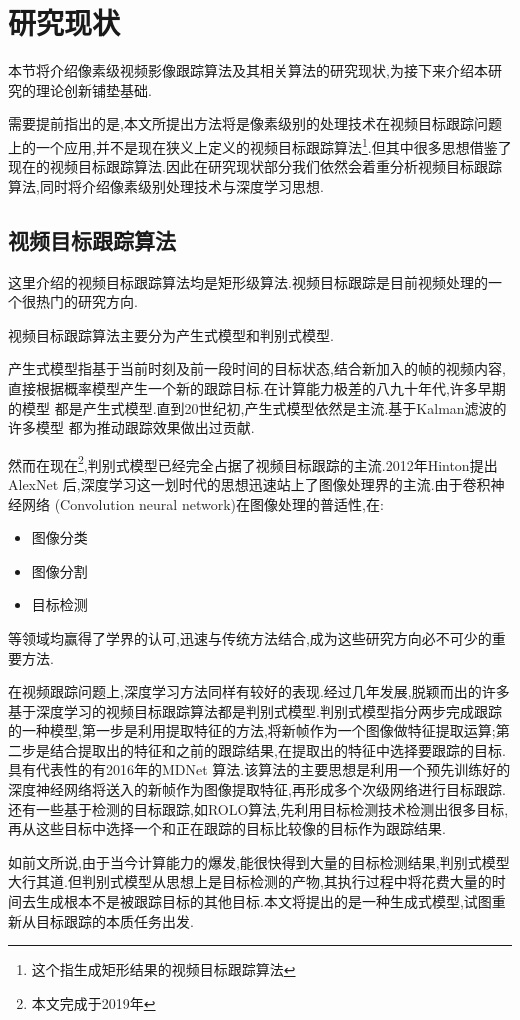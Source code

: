 
\newpage
\section{研究现状}
本节将介绍像素级视频影像跟踪算法及其相关算法的研究现状,为接下来介绍本研究的理论创新铺垫基础.
\par
需要提前指出的是,本文所提出方法将是像素级别的处理技术在视频目标跟踪问题上的一个应用,并不是现在狭义上定义的视频目标跟踪算法\footnote{这个指生成矩形结果的视频目标跟踪算法}.但其中很多思想借鉴了现在的视频目标跟踪算法.因此在研究现状部分我们依然会着重分析视频目标跟踪算法,同时将介绍像素级别处理技术与深度学习思想.

\subsection{视频目标跟踪算法}
这里介绍的视频目标跟踪算法均是矩形级算法.视频目标跟踪是目前视频处理的一个很热门的研究方向.
\par
视频目标跟踪算法主要分为产生式模型和判别式模型.
\par
产生式模型指基于当前时刻及前一段时间的目标状态,结合新加入的帧的视频内容,直接根据概率模型产生一个新的跟踪目标.在计算能力极差的八九十年代,许多早期的模型
\supercite{schalkoff1982model}
都是产生式模型.直到20世纪初,产生式模型依然是主流.基于Kalman滤波的许多模型
\supercite{kim2002fast, weng2006video, comaniciu2003kernel}
都为推动跟踪效果做出过贡献.
\par
然而在现在\footnote{本文完成于2019年},判别式模型已经完全占据了视频目标跟踪的主流.2012年Hinton提出AlexNet 
\supercite{krizhevsky2012imagenet} 
后,深度学习这一划时代的思想迅速站上了图像处理界的主流.由于卷积神经网络
\supercite{krizhevsky2012imagenet} 
(Convolution neural network)在图像处理的普适性,在:
\begin{itemize}
    \item 图像分类\supercite{krizhevsky2012imagenet, witten2016data, he2016deep}
    \item 图像分割\supercite{long2015fully}
    \item 目标检测\supercite{ren2015faster, redmon2016you}
\end{itemize}
等领域均赢得了学界的认可,迅速与传统方法结合,成为这些研究方向必不可少的重要方法.
\par
在视频跟踪问题上,深度学习方法同样有较好的表现.经过几年发展,脱颖而出的许多基于深度学习的视频目标跟踪算法都是判别式模型.判别式模型指分两步完成跟踪的一种模型,第一步是利用提取特征的方法,将新帧作为一个图像做特征提取运算;第二步是结合提取出的特征和之前的跟踪结果,在提取出的特征中选择要跟踪的目标.具有代表性的有2016年的MDNet \supercite{nam2016mdnet}算法.该算法的主要思想是利用一个预先训练好的深度神经网络将送入的新帧作为图像提取特征,再形成多个次级网络进行目标跟踪.还有一些基于检测的目标跟踪,如ROLO\supercite{ning2016spatially}算法,先利用目标检测技术检测出很多目标,再从这些目标中选择一个和正在跟踪的目标比较像的目标作为跟踪结果.
\par
如前文所说,由于当今计算能力的爆发,能很快得到大量的目标检测结果,判别式模型大行其道.但判别式模型从思想上是目标检测的产物,其执行过程中将花费大量的时间去生成根本不是被跟踪目标的其他目标.本文将提出的是一种生成式模型,试图重新从目标跟踪的本质任务出发.

